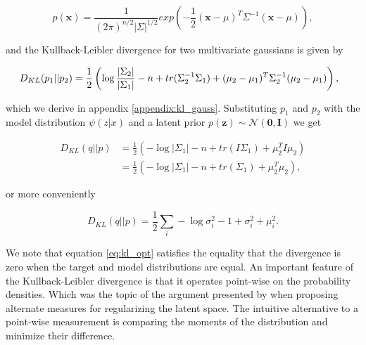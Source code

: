 \begin{equation}
p(\mathbf{x}) = \frac{1}{(2\pi)^{n/2}|\Sigma|^{1/2}}exp(-\frac{1}{2}(\mathbf{x} - \mathbb{\mu})^T\Sigma^{-1}(\mathbf{x}-\mu)),
\end{equation}

\noindent and the Kullback-Leibler divergence for two multivariate gaussians is given by 


\begin{equation}
\hspace*{-0.1in}
D_{KL}(p_1|| p_2 ) = \frac{1}{2} \left( \log \frac{|\Sigma_2|}{|\Sigma_1|} -n + tr(\Sigma^{-1}_2 \Sigma_1) + (\mu_2 - \mu_1)^T\Sigma_2^{-1}(\mu_2 - \mu_1) \right),
\end{equation}

\noindent which we derive in appendix \ref{appendix:kl_gauss}. Substituting $p_1$ and $p_2$ with the model distribution $\psi(z|x)$ and a latent prior $p(\mathbf{z}) \sim \mathcal{N}(\mathbf{0}, \mathbf{I})$ we get 

\begin{align*}
D_{KL}(q||p) &= \frac{1}{2} \left( - \log {|\Sigma_1|} -n + tr(I \Sigma_1) + \mu_2 ^TI\mu_2 \right) \\
&= \frac{1}{2} \left( - \log {|\Sigma_1|} -n + tr(\Sigma_1) + \mu_2 ^T\mu_2 \right),
\end{align*}

\noindent or more conveniently

\begin{equation}\label{eq:kl_opt}
D_{KL}(q||p) = \frac{1}{2} \sum_i -\log \sigma_i^2 - 1 + \sigma^2_i + \mu_i^2 .
\end{equation}


\noindent We note that equation \ref{eq:kl_opt} satisfies the equality that the divergence is zero when the target and model distributions are equal. An important feature of the Kullback-Leibler divergence is that it operates point-wise on the probability densities. Which was the topic of the argument presented by \citet{Zhao} when proposing alternate measures for regularizing the latent space. The intuitive alternative to a point-wise measurement is comparing the moments of the distribution and minimize their difference. 